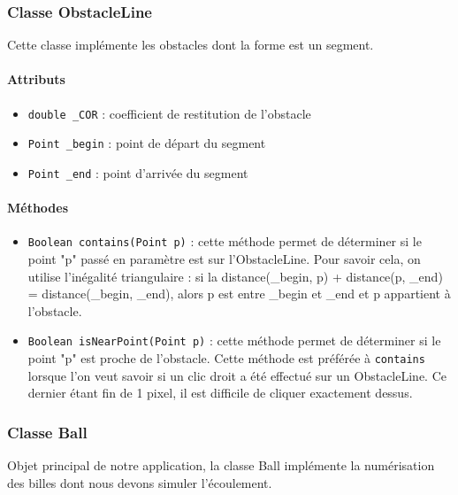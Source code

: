 \documentclass{report}
\begin{document}
\subsubsection{Classe ObstacleLine}

Cette classe implémente les obstacles dont la forme est un segment.

\paragraph*{Attributs}
\begin{itemize}
\item \texttt{double \_COR} : coefficient de restitution de l'obstacle 
\item \texttt{Point \_begin} : point de départ du segment
\item \texttt{Point \_end} : point d'arrivée du segment
\end{itemize}

\paragraph*{Méthodes}
\begin{itemize}
\item \texttt{Boolean contains(Point p)} : cette méthode permet de déterminer si le point "p" passé en paramètre est sur l'ObstacleLine. Pour savoir cela, on utilise l'inégalité triangulaire : si la distance(\_begin, p)  + distance(p, \_end) = distance(\_begin, \_end), alors p est entre \_begin et \_end et p appartient à l'obstacle.
\item \texttt{Boolean isNearPoint(Point p)} : cette méthode permet de déterminer si le point "p" est proche de l'obstacle. Cette méthode est préférée à \texttt{contains} lorsque l'on veut savoir si un clic droit a été effectué sur un ObstacleLine. Ce dernier étant fin de 1 pixel, il est difficile de cliquer exactement dessus.
\end{itemize}

\subsubsection{Classe Ball}

Objet principal de notre application, la classe Ball implémente la numérisation des billes dont nous devons simuler l'écoulement.
\end{document}

